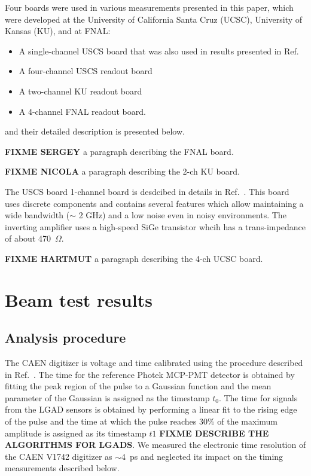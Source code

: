 \documentclass[preprint,1p]{elsarticle}
\begin{document}
Four boards were used in various measurements presented in this paper, which
were developed at the University of California Santa Cruz (UCSC), University of
Kansas (KU), and at FNAL:

\begin{itemize}
  \item A single-channel USCS board that
was also used in results presented in Ref.~\cite{Cartiglia201783}
\item A four-channel USCS readout board
\item A two-channel KU readout board
\item A 4-channel FNAL readout board.
\end{itemize}

and their detailed description is presented below.  

\textbf {FIXME SERGEY} a paragraph describing the FNAL board. 

\textbf {FIXME NICOLA} a paragraph describing the 2-ch KU board. 

The USCS board 1-channel board is desdcibed in details in
Ref.~\cite{Cartiglia201783}. This board uses discrete components and contains
several features which allow maintaining a wide bandwidth ($\sim$ 2 GHz) and a
low noise even in noisy environments. The inverting amplifier uses a high-speed
SiGe transistor whcih has a trans-impedance of about 470~$\Omega$. 

\textbf {FIXME HARTMUT} a paragraph describing the 4-ch UCSC board. 


\section{Beam test results}

\subsection{Analysis procedure}

The CAEN digitizer is voltage and time calibrated using the procedure described
in Ref.~\cite{Kim201467}. The time for the reference Photek MCP-PMT detector is
obtained by fitting the peak region of the pulse to a Gaussian function and the
mean parameter of the Gaussian is assigned as the timestamp $t_0$. The time for
signals from the LGAD sensors is obtained by performing a linear fit to the
rising edge of the pulse and the time at which the pulse reaches 30\% of the
maximum amplitude is assigned as its timestamp $t1$ \textbf{FIXME DESCRIBE THE
ALGORITHMS FOR LGADS}. We measured the electronic time resolution of the CAEN
V1742 digitizer as $\sim$4~ps and neglected its impact on the timing
measurements described below. 
\end{document}
